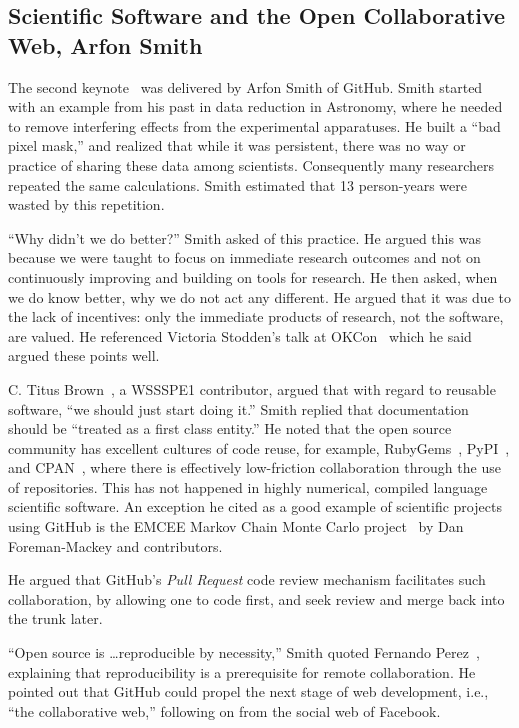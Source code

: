 \documentclass[11pt, oneside]{amsart}
\begin{document}
\subsection{Scientific Software and the Open Collaborative Web, Arfon Smith} \label{sec:keynote2}

The second keynote~\cite{WSSSPE1-keynote2} was delivered by Arfon Smith of
GitHub. Smith started with an example from his past in data
reduction in Astronomy, where he needed to remove interfering effects from the
experimental apparatuses. He built a ``bad pixel mask,'' and realized that
while it was persistent, there was no way or practice of sharing these data
among scientists. Consequently many researchers repeated the same
calculations. Smith estimated that 13 person-years were wasted by this
repetition.

``Why didn't we do better?''  Smith asked of this practice. He argued
this was because we were taught to focus on immediate research
outcomes and not on continuously improving and building on tools for
research. He then asked, when we do know better, why we do not act any
different. He argued that it was due to the lack of incentives:
only the immediate products of research, not the software, are valued.
He referenced Victoria Stodden's talk at
OKCon~\cite{okcon-stodden-talk} which he said argued these points
well.

C. Titus Brown~\cite{ged-web}, a WSSSPE1 contributor,
argued that with regard to reusable software, ``we should just start
doing it.''  Smith replied that documentation should be
``treated as a first class entity.''  He noted that the open source
community has excellent cultures of code reuse, for example,
RubyGems~\cite{rubygems-web}, PyPI~\cite{pypi-web}, and
CPAN~\cite{cpan-web}, where there is effectively low-friction
collaboration through the use of repositories. This has not happened
in highly numerical, compiled language scientific software.  An
exception he cited as a good example of scientific projects using
GitHub is the EMCEE Markov Chain Monte Carlo project~\cite{emcee-web}
by Dan Foreman-Mackey and contributors.

He argued that GitHub's \emph{Pull Request} code review mechanism
facilitates such collaboration, by allowing one to code first, and
seek review and merge back into the trunk later.

``Open source is \ldots reproducible by necessity,'' Smith quoted
Fernando Perez~\cite{perez-open-src-reproducible}, explaining that
reproducibility is a prerequisite for remote collaboration.  He
pointed out that GitHub could propel the next stage of web
development, i.e., ``the collaborative web,'' following on from the
social web of Facebook.
\end{document}
